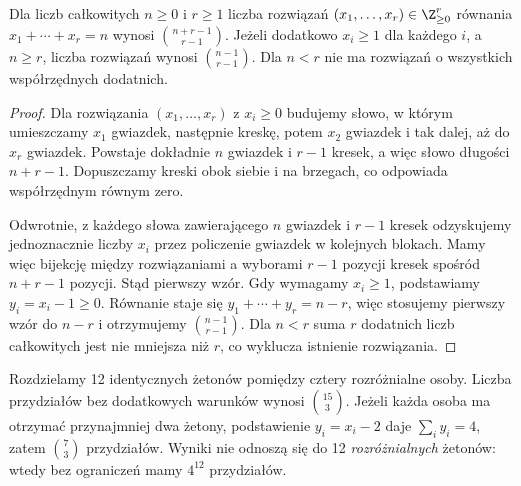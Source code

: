 \begin{twierdzenie}
Dla liczb całkowitych $n\geq0$ i $r\geq1$ liczba rozwiązań
$(x_1,\ldots,x_r)\in\Z_{\geq0}^r$ równania $x_1+\cdots+x_r=n$ wynosi
$\binom{n+r-1}{r-1}$. Jeżeli dodatkowo $x_i\geq1$ dla każdego $i$,
a $n\geq r$, liczba rozwiązań wynosi $\binom{n-1}{r-1}$.
Dla $n<r$ nie ma rozwiązań o wszystkich współrzędnych dodatnich.
\end{twierdzenie}
\begin{proof}
Dla rozwiązania $(x_1,\ldots,x_r)$ z $x_i\geq0$
budujemy słowo, w którym umieszczamy $x_1$ gwiazdek,
następnie kreskę, potem $x_2$ gwiazdek i tak dalej,
aż do $x_r$ gwiazdek. Powstaje dokładnie $n$ gwiazdek
i $r-1$ kresek, a więc słowo długości $n+r-1$.
Dopuszczamy kreski obok siebie i na brzegach,
co odpowiada współrzędnym równym zero.

Odwrotnie, z każdego słowa zawierającego $n$ gwiazdek
i $r-1$ kresek odzyskujemy jednoznacznie liczby $x_i$
przez policzenie gwiazdek w kolejnych blokach.
Mamy więc bijekcję między rozwiązaniami a wyborami
$r-1$ pozycji kresek spośród $n+r-1$ pozycji.
Stąd pierwszy wzór. Gdy wymagamy $x_i\geq1$, podstawiamy
$y_i=x_i-1\geq0$. Równanie staje się
$y_1+\cdots+y_r=n-r$, więc stosujemy pierwszy wzór
do $n-r$ i otrzymujemy $\binom{n-1}{r-1}$.
Dla $n<r$ suma $r$ dodatnich liczb całkowitych jest nie mniejsza
niż $r$, co wyklucza istnienie rozwiązania.
\end{proof}

\begin{przyklad}
Rozdzielamy 12 identycznych żetonów pomiędzy cztery rozróżnialne osoby.
Liczba przydziałów bez dodatkowych warunków wynosi $\binom{15}{3}$.
Jeżeli każda osoba ma otrzymać przynajmniej dwa żetony, podstawienie
$y_i=x_i-2$ daje $\sum_i y_i=4$, zatem $\binom73$ przydziałów.
Wyniki nie odnoszą się do 12 \emph{rozróżnialnych} żetonów:
wtedy bez ograniczeń mamy $4^{12}$ przydziałów.
\end{przyklad}

